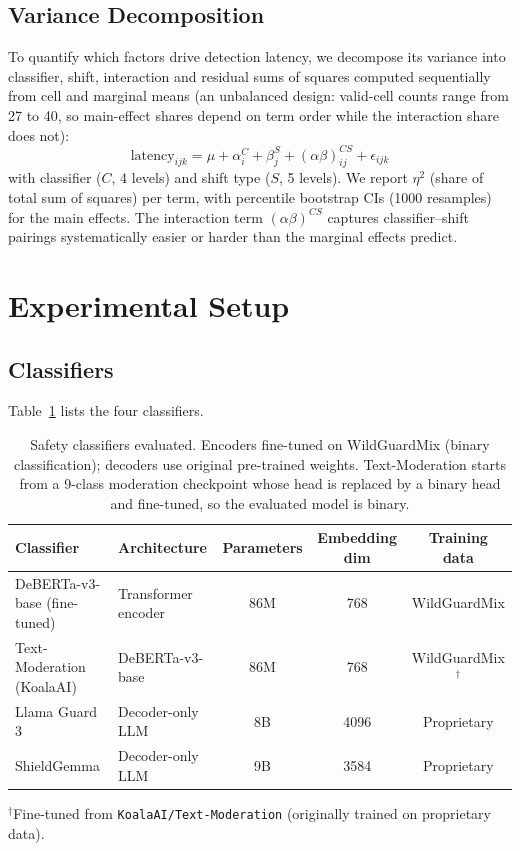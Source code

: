 \documentclass{article}
\begin{document}
\subsection{Variance Decomposition}
\label{sec:anova}

To quantify which factors drive detection latency, we decompose its variance into classifier, shift, interaction and residual sums of squares computed sequentially from cell and marginal means (an unbalanced design: valid-cell counts range from 27 to 40, so main-effect shares depend on term order while the interaction share does not):
\begin{equation}
\text{latency}_{ijk} = \mu + \alpha_i^C + \beta_j^S + (\alpha\beta)_{ij}^{CS} + \epsilon_{ijk}
\end{equation}
with classifier ($C$, 4 levels) and shift type ($S$, 5 levels). We report $\eta^2$ (share of total sum of squares) per term, with percentile bootstrap CIs (1000 resamples) for the main effects. The interaction term $(\alpha\beta)^{CS}$ captures classifier--shift pairings systematically easier or harder than the marginal effects predict.


\section{Experimental Setup}
\label{sec:setup}

\subsection{Classifiers}
\label{sec:classifiers}

Table~\ref{tab:classifiers} lists the four classifiers.

\begin{table}[t]
\caption{Safety classifiers evaluated. Encoders fine-tuned on WildGuardMix (binary classification); decoders use original pre-trained weights. Text-Moderation starts from a 9-class moderation checkpoint whose head is replaced by a binary head and fine-tuned, so the evaluated model is binary.}
\label{tab:classifiers}
\centering
\small
\begin{tabular}{llccc}
\toprule
\textbf{Classifier} & \textbf{Architecture} & \textbf{Parameters} & \textbf{Embedding dim} & \textbf{Training data} \\
\midrule
DeBERTa-v3-base (fine-tuned) & Transformer encoder & 86M & 768 & WildGuardMix \\
Text-Moderation (KoalaAI) & DeBERTa-v3-base & 86M & 768 & WildGuardMix$^\dagger$ \\
Llama Guard 3 & Decoder-only LLM & 8B & 4096 & Proprietary \\
ShieldGemma & Decoder-only LLM & 9B & 3584 & Proprietary \\
\bottomrule
\end{tabular}
\vspace{2pt}

{\footnotesize $^\dagger$Fine-tuned from \texttt{KoalaAI/Text-Moderation} (originally trained on proprietary data).}
\end{table}
\end{document}
